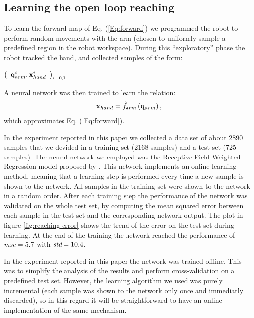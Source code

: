 \subsection{Learning the open loop reaching}
\label{sec:learning-open-loop}
%
To learn the forward map of Eq. (\ref{Eq:forward}) we programmed 
the robot to perform random movements with the arm (chosen to uniformly sample 
a predefined region in the robot workspace). During this ``exploratory'' 
phase the robot tracked the hand, and collected samples of the form:
%
\begin{center}
\begin{math}
  \left(\begin{array}{cc}
    \mathbf q_{arm}^i , \mathbf{x}_{hand}^i\end{array}\right)_{i = 0,1\dots}
\end{math}
\end{center}
%
A neural network was then trained to learn the relation:
%
\begin{equation} 
  \mathbf{x}_{hand}=\hat{f}_{arm}\left(\mathbf q_{arm} \right),
\end{equation}
%
which approximates Eq. (\ref{Eq:forward}).

In the experiment reported in this paper we collected a data set of 
about 2890 samples that we devided in a training set (2168 samples) and 
a test set (725 samples). The neural network we employed was the 
Receptive Field Weighted Regression model proposed 
by \cite{schaal98Constructive}. This network implements an online learning
method, meaning that a learning step is performed every time a new 
sample is shown to the network. All samples in the training set were shown
to the network in a random order. After each training step the 
performance of the network was validated on the whole test set, by computing
the mean squared error between each sample in the test set and the 
corresponding network output. The plot in figure \ref{fig:reaching-error}
shows the trend of the error on the test set during learning. At the end of
the training the network reached the performance of $\emph{mse}=5.7$ 
with $\emph{std}=10.4$.

In the experiment reported in this paper the network was trained offline. 
This was to simplify the analysis of the results and perform cross-validation 
on a predefined test set. However, the learning algorithm we used was purely 
incremental (each sample was shown to the network only once and immediatly 
discarded), so in this regard it will be straightforward to have an 
online implementation of the same mechanism.

